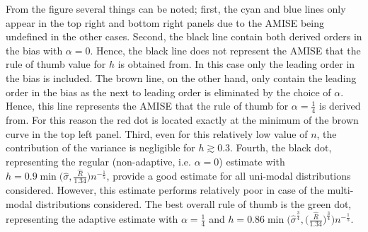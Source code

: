 \documentclass[
twoside,
openright,
titlepage,
numbers=noenddot,
headinclude,%
footinclude=true,
dottedtoc, %
ngerman,
american, %
pagesize=pdftex,
]{book}
\begin{document}
\begin{example}
\begin{figure}[H]
			\label{fig:e2}
		\end{figure}
		From the figure several things can be noted; first, the cyan and blue lines only appear in the top right and bottom right panels due to the AMISE being undefined in the other cases. Second, the black line contain both derived orders in the bias with $\alpha=0$. Hence, the black line does not represent the AMISE that the rule of thumb value for $h$ is obtained from. In this case only the leading order in the bias is included. The brown line, on the other hand, only contain the leading order in the bias as the next to leading order is eliminated by the choice of $\alpha$. Hence, this line represents the AMISE that the rule of thumb for $\alpha=\frac{1}{4}$ is derived from. For this reason the red dot is located exactly at the minimum of the brown curve in the top left panel. Third, even for this relatively low value of $n$, the contribution of the variance is negligible for $h\gtrsim 0.3$. Fourth, the black dot, representing the regular (non-adaptive, i.e. $\alpha=0$) estimate with $h=0.9\min\big(\hat{\sigma},\frac{\hat{R}}{1.34}\big)n^{-\frac{1}{5}}$, provide a good estimate for all uni-modal distributions considered. However, this estimate performs relatively poor in case of the multi-modal distributions considered. The best overall rule of thumb is the green dot, representing the adaptive estimate with $\alpha=\frac{1}{4}$ and $h=0.86\min\big(\hat{\sigma}^{\frac{3}{4}},\big(\frac{\hat{R}}{1.34}\big)^\frac{3}{4}\big)n^{-\frac{1}{5}}$.
	\end{example}
	
\end{document}
